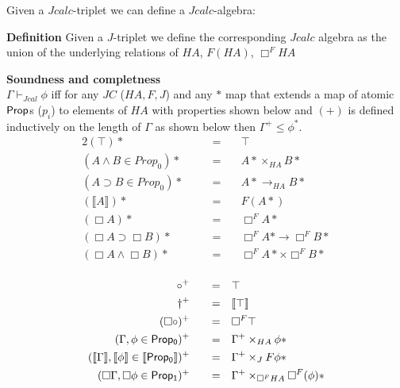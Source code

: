 			Given a $Jcalc$-triplet we can define a $Jcalc$-algebra:
			\begin{mdframed}
				\textbf{Definition}
				Given a $J$-triplet we define the corresponding $Jcalc$ algebra as the union of the underlying relations
				of   $HA$, $F(HA)$, $\Box^{F}HA$
			\end{mdframed}
				\begin{theorem}\label{thm:cmpjtriplet}
					\textbf{Soundness and completness}\\
				$\Gamma\vdash_{Jcal}\phi$ iff for any   $JC$ ($HA,F,J$)
				and any $*$ map that extends  a map of atomic $\prop$s ($p_i$) to elements of $HA$ 
				with properties shown below and $(+)$ 
				is defined inductively on the length of $\Gamma$ as shown below
				then $\Gamma^+\leq\phi^{*}$.
				\begin{alignat*}{2}
					(\top)* &&\quad= & \quad\top\\
					(A\wedge B \in Prop_0)*  &&\quad = & \quad  A*\times_{HA}B*\\
					(A\supset B \in Prop_0)*  &&\quad = & \quad A*\rightarrow_{HA} B*\\
					(\llbracket A\rrbracket)* && \quad = & \quad F(A*)\\					
					(\Box A)* &&\quad = & \quad\Box^F A* \\
					(\Box A\supset \Box B)*  &&\quad = & \quad\Box^F A* \rightarrow{\Box^F B*}\\
					(\Box A\wedge\Box B)*  &&\quad = & \quad\Box^F A*\times{\Box^F B*}\\
				\end{alignat*}
				
				\begin{alignat*}{2}
				  \circ^+  &&\quad = & \quad\top\\
				  \dagger^+ &&\quad = & \quad\llbracket\top\rrbracket\\
				  (\Box\circ)^+ &&\quad = & \quad\Box^F \top\\
				  (\Gamma,\phi\in \sf {Prop_0})^+&&\quad = &\quad
				  \Gamma^+\times_{HA}\phi* \\
				  (\llbracket \Gamma\rrbracket,\llbracket\phi\rrbracket \in {\sf \llbracket Prop_0\rrbracket})^+&&\quad = &\quad
				  \Gamma^+\times_{J}F\phi*\\
				  (\Box\Gamma, \Box\phi \in {\sf Prop_1})^+&&\quad = &\quad
				  \Gamma^+\times_{\Box^{F}HA}\Box^F (\phi)*\\
				\end{alignat*}
				\end{theorem}
